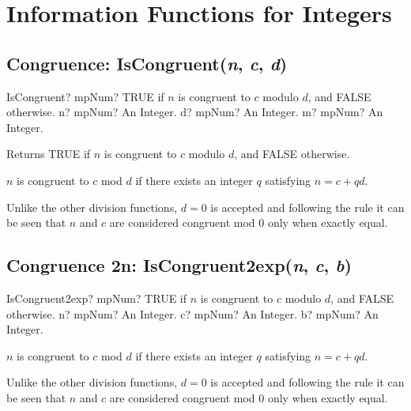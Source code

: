 \section{Information Functions for Integers}
\label{InformationFunctionsForIntegers}





\subsection{Congruence: IsCongruent(\textit{n}, \textit{c}, \textit{d})}

\begin{mpFunctionsExtract}
	\mpFunctionThree
	{IsCongruent? mpNum? TRUE if $n$ is congruent to $c$ modulo $d$, and FALSE otherwise.}
	{n? mpNum? An Integer.}
	{d? mpNum? An Integer.}
	{m? mpNum? An Integer.}
\end{mpFunctionsExtract}

\vspace{0.3cm}
Returns TRUE if $n$ is congruent to $c$ modulo $d$, and FALSE otherwise.

$n$ is congruent to $c$ mod $d$ if there exists an integer $q$ satisfying $n = c + qd$. 

Unlike the other division functions, $d = 0$ is accepted and following the rule it can be seen that $n$ and $c$ are considered congruent mod 0 only when exactly equal.




\subsection{Congruence 2n: IsCongruent2exp(\textit{n}, \textit{c}, \textit{b})}

\begin{mpFunctionsExtract}
	\mpFunctionThree
	{IsCongruent2exp? mpNum? TRUE if $n$ is congruent to $c$ modulo $d$, and FALSE otherwise.}
	{n? mpNum? An Integer.}
	{c? mpNum? An Integer.}
	{b? mpNum? An Integer.}
\end{mpFunctionsExtract}

\vspace{0.3cm}

$n$ is congruent to $c$ mod $d$ if there exists an integer $q$ satisfying $n = c + qd$. 

Unlike the other division functions, $d = 0$ is accepted and following the rule it can be seen that $n$ and $c$ are considered congruent mod 0 only when exactly equal.




